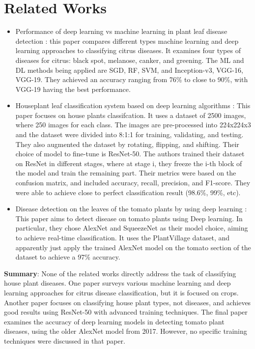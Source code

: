 \documentclass[12pt]{article}
\begin{document}
\section{Related Works}
\begin{itemize}
    \item Performance of deep learning vs machine learning in plant leaf disease detection \cite{Sujatha2020}: this paper compares different types machine learning and deep learning approaches to classifying citrus diseases. It examines four types of diseases for citrus: black spot, melanose,  canker, and greening. The ML and DL methods being applied are SGD, RF, SVM, and Inception-v3, VGG-16, VGG-19. They achieved an accuracy ranging from 76\% to close to 90\%, with VGG-19 having the best performance.

    \item Houseplant leaf classification system based on deep learning algorithms \cite{Hama2024}:
    This paper focuses on house plants classifcation. It uses a dataset of 2500 images, where 250 images for each class. The images are pre-processed into 224x224x3 and the dataset were divided into 8:1:1 for training, validating, and testing. They also augmented the dataset by rotating, flipping, and shifting. Their choice of model to fine-tune is ResNet-50. The authors trained their dataset on ResNet in different stages, where at stage i, they freeze the i-th block of the model and train the remaining part. Their metrics were based on the confusion matrix, and included accuracy, recall, precision, and F1-score. They were able to achieve close to perfect classification result (98.6\%, 99\%, etc).

    \item Disease detection on the leaves of the tomato plants by using deep learning \cite{Durmus2017}: This paper aims to detect disease on tomato plants using Deep learning. In particular, they chose AlexNet and SqueezeNet as their model choice, aiming to achieve real-time classification. It uses the PlantVillage dataset, and apparently just apply the trained AlexNet model on the tomato section of the dataset to achieve a 97\% accuracy. 
\end{itemize}

\textbf{Summary}: None of the related works directly address the task of classifying house plant diseases. One paper surveys various machine learning and deep learning approaches for citrus disease classification, but it is focused on crops. Another paper focuses on classifying house plant types, not diseases, and achieves good results using ResNet-50 with advanced training techniques. The final paper examines the accuracy of deep learning models in detecting tomato plant diseases, using the older AlexNet model from 2017. However, no specific training techniques were discussed in that paper.
\end{document}
